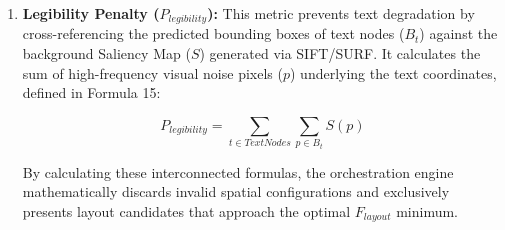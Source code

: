 \begin{refsection}
\begin{enumerate}
    \begin{center}
    \begin{minipage}{0.8\textwidth}
    \begin{equation}
    P_{whitespace} = \left| \frac{Area_{canvas} - \sum_{i=1}^{N} Area(B_i)}{Area_{canvas}} - R_{target} \right|
    \end{equation}
    \centering
    \end{minipage}
    \end{center}

    For the whitespace ratio calculation, the reference area was strictly defined as the candidate's designated content region (e.g., the active text column within an art-column archetype) rather than the global page canvas. This localized area calculation ensured that asymmetric or split layouts were accurately evaluated for negative space without being inadvertently penalized for off-center spatial compositions.
	
	\item \textbf{Legibility Penalty ($P_{legibility}$):} This metric prevents text degradation by cross-referencing the predicted bounding boxes of text nodes ($B_t$) against the background Saliency Map ($S$) generated via SIFT/SURF. It calculates the sum of high-frequency visual noise pixels ($p$) underlying the text coordinates, defined in Formula 15:
    
    \begin{center}
    \begin{minipage}{0.8\textwidth}
    \begin{equation}
    P_{legibility} = \sum_{t \in TextNodes} \sum_{p \in B_t} S(p)
    \end{equation}
    \centering
    \end{minipage}
    \end{center}

    By calculating these interconnected formulas, the orchestration engine mathematically discards invalid spatial configurations and exclusively presents layout candidates that approach the optimal $F_{layout}$ minimum.

\end{enumerate}



\end{refsection}
